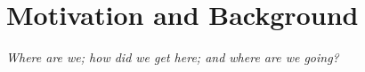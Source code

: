 

\chapter{Motivation and Background}
\begin{center}
{\small\em Where are we; how did we get here; and where are we going?}
\end{center}











